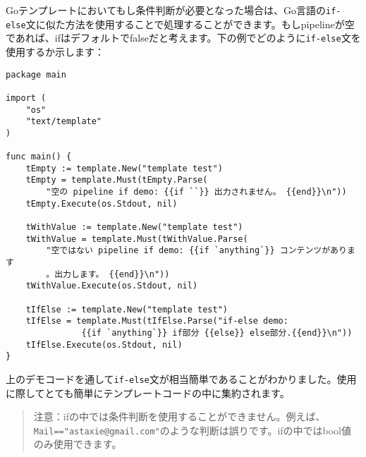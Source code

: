 Goテンプレートにおいてもし条件判断が必要となった場合は、Go言語の\texttt{if-else}文に似た方法を使用することで処理することができます。もしpipelineが空であれば、ifはデフォルトでfalseだと考えます。下の例でどのように\texttt{if-else}文を使用するか示します：


\begin{lstlisting}[numbers=none]
package main

import (
    "os"
    "text/template"
)

func main() {
    tEmpty := template.New("template test")
    tEmpty = template.Must(tEmpty.Parse(
        "空の pipeline if demo: {{if ``}} 出力されません。 {{end}}\n"))
    tEmpty.Execute(os.Stdout, nil)

    tWithValue := template.New("template test")
    tWithValue = template.Must(tWithValue.Parse(
        "空ではない pipeline if demo: {{if `anything`}} コンテンツがあります
        。出力します。 {{end}}\n"))
    tWithValue.Execute(os.Stdout, nil)

    tIfElse := template.New("template test")
    tIfElse = template.Must(tIfElse.Parse("if-else demo:
               {{if `anything`}} if部分 {{else}} else部分.{{end}}\n"))
    tIfElse.Execute(os.Stdout, nil)
}
\end{lstlisting}

上のデモコードを通して\texttt{if-else}文が相当簡単であることがわかりました。使用に際してとても簡単にテンプレートコードの中に集約されます。

\begin{quote}
注意：ifの中では条件判断を使用することができません。例えば、\texttt{Mail=="astaxie@gmail.com"}のような判断は誤りです。ifの中ではbool値のみ使用できます。
\end{quote}
